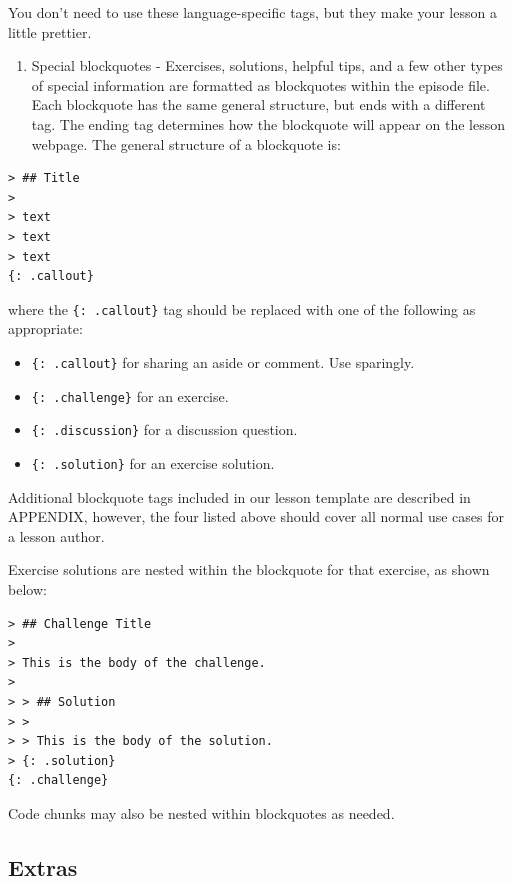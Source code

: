 \documentclass[]{book}
\providecommand{\tightlist}{%
  \setlength{\itemsep}{0pt}\setlength{\parskip}{0pt}}
\begin{document}
You don't need to use these language-specific tags, but they make your lesson a little prettier.

\begin{enumerate}
\def\labelenumi{\arabic{enumi}.}
\tightlist
\item
  Special blockquotes - Exercises, solutions, helpful tips, and a few other types of special information are
  formatted as blockquotes within the episode file. Each blockquote has the same general structure, but ends
  with a different tag. The ending tag determines how the blockquote will appear on the lesson webpage. The
  general structure of a blockquote is:
\end{enumerate}

\begin{verbatim}
> ## Title
>
> text
> text
> text
{: .callout}
\end{verbatim}

where the \texttt{\{:\ .callout\}} tag should be replaced with one of the following as appropriate:

\begin{itemize}
\tightlist
\item
  \texttt{\{:\ .callout\}} for sharing an aside or comment. Use sparingly.
\item
  \texttt{\{:\ .challenge\}} for an exercise.
\item
  \texttt{\{:\ .discussion\}} for a discussion question.
\item
  \texttt{\{:\ .solution\}} for an exercise solution.
\end{itemize}

Additional blockquote tags included in our lesson template are described in APPENDIX, however, the four listed
above should cover all normal use cases for a lesson author.

Exercise solutions are nested within the blockquote for that exercise, as shown below:

\begin{verbatim}
> ## Challenge Title
>
> This is the body of the challenge.
>
> > ## Solution
> >
> > This is the body of the solution.
> {: .solution}
{: .challenge}
\end{verbatim}

Code chunks may also be nested within blockquotes as needed.

\hypertarget{extras}{%
\subsection{Extras}\label{extras}}
\end{document}
